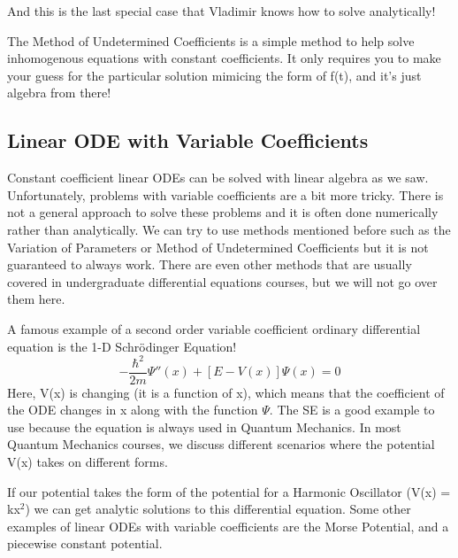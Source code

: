 \documentclass{article}
\newcommand{\be}{\begin{equation}}
\newcommand{\ee}{\end{equation}}
\begin{document}
And this is the last special case that Vladimir knows how to solve analytically!

The Method of Undetermined Coefficients is a simple method to help solve inhomogenous equations with constant coefficients.
It only requires you to make your guess for the particular solution mimicing the form of f(t), and it's just algebra from there!

\subsection*{Linear ODE with Variable Coefficients}
Constant coefficient linear ODEs can be solved with linear algebra as we saw.
Unfortunately, problems with variable coefficients are a bit more tricky.
There is not a general approach to solve these problems and it is often done numerically rather than analytically.
We can try to use methods mentioned before such as the Variation of Parameters or Method of Undetermined Coefficients but it is not guaranteed to always work.
There are even other methods that are usually covered in undergraduate differential equations courses, but we will not go over them here.

A famous example of a second order variable coefficient ordinary differential equation is the 1-D Schr\"odinger Equation!
\be
-\frac{\hbar^2}{2m} \Psi''(x) + [E - V(x)] \Psi(x) = 0
\ee
Here, V(x) is changing (it is a function of x), which means that the coefficient of the ODE changes in x along with the function $\Psi$.
The SE is a good example to use because the equation is always used in Quantum Mechanics. In most Quantum Mechanics courses, we discuss different scenarios where the potential V(x) takes on different forms.

If our potential takes the form of the potential for a Harmonic Oscillator (V(x) = kx$^2$) we can get analytic solutions to this differential equation.
Some other examples of linear ODEs with variable coefficients are the Morse Potential, and a piecewise constant potential.
\end{document}

